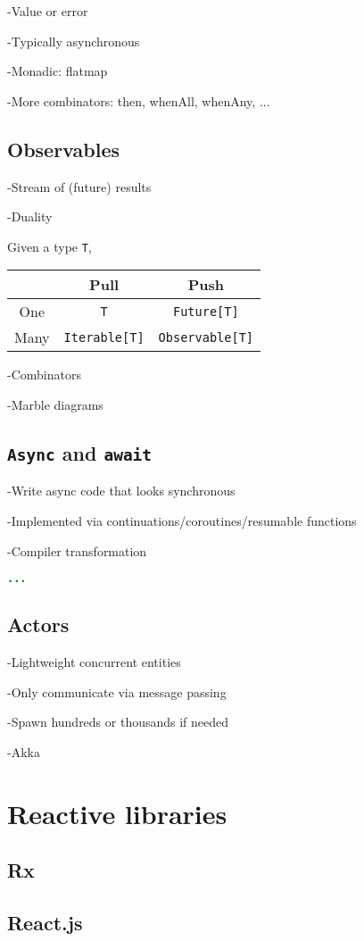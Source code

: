 -Value or error

-Typically asynchronous

-Monadic: flatmap

-More combinators: then, whenAll, whenAny, ...



\subsection{Observables}

-Stream of (future) results

-Duality

Given a type \texttt{T}, 

\begin{tabular}{|c|c|c|}
\hline
& Pull & Push \\\hline
One & \texttt{T} & \texttt{Future[T]} \\\hline
Many & \texttt{Iterable[T]} & \texttt{Observable[T]} \\\hline
\end{tabular}


-Combinators

-Marble diagrams

\subsection{\texttt{Async} and \texttt{await}}

-Write async code that looks synchronous

-Implemented via continuations/coroutines/resumable functions

-Compiler transformation

\begin{code}
\begin{lstlisting}[language=Java,caption=Async/await.\label{listing:async-await}]
...
\end{lstlisting}
\end{code}

\subsection{Actors}

-Lightweight concurrent entities

-Only communicate via message passing

-Spawn hundreds or thousands if needed

-Akka

\section{Reactive libraries}

\subsection{Rx}

\subsection{React.js}